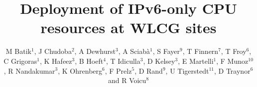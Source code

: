 \documentclass[a4paper]{jpconf}
\begin{document}
\title{Deployment of IPv6-only CPU resources at WLCG sites}


\author{M Batik$^1$, J Chudoba$^2$, A Dewhurst$^3$, A Sciab\`a$^1$, S
  Fayer$^9$, T Finnern$^7$, T Froy$^6$, C Grigoras$^1$, K Hafeez$^3$,
  B Hoeft$^4$, T Idiculla$^3$, D Kelsey$^3$, E Martelli$^1$, F
  Munoz$^{10}$, R Nandakumar$^3$, K Ohrenberg$^6$, F Prelz$^5$, D
  Rand$^9$, U Tigerstedt$^{11}$, D Traynor$^6$ and R Voicu$^8$}

\address{$^1$ CERN, CH-1211 Gen\`{e}ve 23, Switzerland}
\address{$^2$ Institute of Physics, Academy of Sciences of the Czech
  Republic Na Slovance 2 182 21 Prague 8, Czech Republic}
\address{$^3$ STFC - Rutherford Appleton Lab. UK}
\address{$^4$ Karlsruher Institut f\"{u}r Technologie,
  Hermann-von-Helmholtz-Platz 1, D-76344 Eggenstein-Leopoldshafen,
  Germany}
\address{$^5$ INFN, Sezione di Milano, via G. Celoria 16, I-20133
  Milano, Italy}
\address{$^6$ Queen Mary University of London, Mile End Road, London
  E1 4NS, United Kingdom}
\address{$^7$ Deutsches Elektronen-Synchrotron, Notkestra{\ss}e 85,
  D-22607 Hamburg, Germany}
\address{$^8$ California Institute of Technology, Pasadena, Ca 91125,
  U.S.A.}
\address{$^9$ Imperial College London, South Kensington Campus, London
  SW7 2AZ, United Kingdom}
\address{$^{10}$ Port d’Informaci\'{o} Cient\'{i}fica (PIC),
  Universitat Aut\`{o}noma de Barcelona, Bellaterra (Barcelona),
  Spain}
\address{$^{11}$ CSC Tieteen Tietotekniikan Keskus Oy, P.O. Box 405,
  FI-02101 Espoo, Finland}
\end{document}
